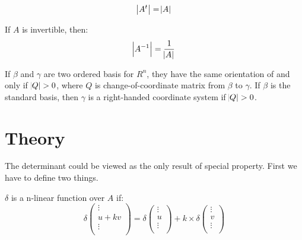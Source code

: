 \begin{theorem}
    \begin{equation}
        \abs{A^t} = \abs{A}
    \end{equation}    
\end{theorem}

\begin{theorem}
    If $A$ is invertible, then:
    \begin{equation}
        \abs{{A}^{-1}} = \frac{1}{\abs{A}}
    \end{equation}    
\end{theorem}




\begin{definition}
    If $\beta$ and $\gamma$ are two ordered basis for $R^n$, they have the same orientation of and only if $\abs{Q} > 0$, where $Q$ is change-of-coordinate matrix from $\beta$ to $\gamma$. If $\beta$ is the standard basis, then $\gamma$ is a right-handed coordinate system if $\abs{Q} > 0$.
\end{definition}


\section{Theory}

The determinant could be viewed as the only result of special property. First we have to define two things.

\begin{definition}
    $\delta$ is a n-linear function over $A$ if:
    \begin{equation}
        \delta \begin{pmatrix}
            \vdots \\
            u + kv \\
            \vdots \\
        \end{pmatrix} = \delta \begin{pmatrix}
            \vdots \\
            u \\
            \vdots \\
        \end{pmatrix} + k \times \delta \begin{pmatrix}
            \vdots \\
            v \\
            \vdots \\
        \end{pmatrix} 
    \end{equation}
\end{definition}


